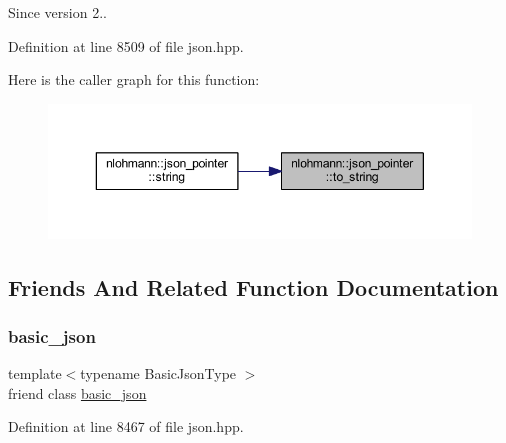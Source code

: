 \begin{DoxySince}{Since}
version 2.. 
\end{DoxySince}


Definition at line 8509 of file json.\+hpp.

Here is the caller graph for this function\+:
\nopagebreak
\begin{figure}[H]
\begin{center}
\leavevmode
\includegraphics[width=350pt]{classnlohmann_1_1json__pointer_a3d4b15d32d096e3776c5d2c773b524f5_icgraph}
\end{center}
\end{figure}


\subsection{Friends And Related Function Documentation}
\mbox{\label{classnlohmann_1_1json__pointer_ada3100cdb8700566051828f1355fa745}} 
\subsubsection{\texorpdfstring{basic\_json}{basic\_json}}
{\footnotesize\ttfamily template$<$typename Basic\+Json\+Type $>$ \\
friend class \mbox{\hyperlink{classnlohmann_1_1basic__json}{basic\+\_\+json}}\hspace{0.3cm}{\ttfamily [friend]}}



Definition at line 8467 of file json.\+hpp.

\mbox{\label{classnlohmann_1_1json__pointer_a6779edcf28e6f018a3bbb29c0b4b5e1e}} 
